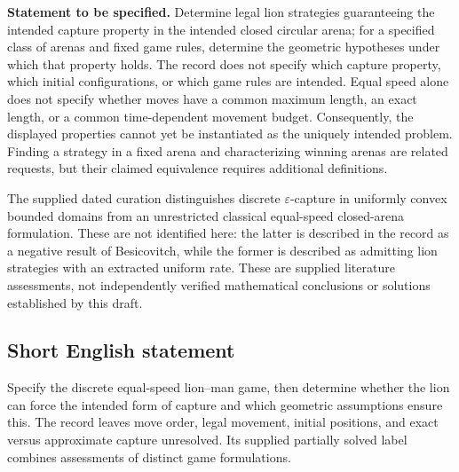 \documentclass[11pt]{article}
\begin{document}
\textbf{Statement to be specified.} Determine legal lion strategies guaranteeing the intended capture property in the intended closed circular arena; for a specified class of arenas and fixed game rules, determine the geometric hypotheses under which that property holds. The record does not specify which capture property, which initial configurations, or which game rules are intended. Equal speed alone does not specify whether moves have a common maximum length, an exact length, or a common time-dependent movement budget. Consequently, the displayed properties cannot yet be instantiated as the uniquely intended problem. Finding a strategy in a fixed arena and characterizing winning arenas are related requests, but their claimed equivalence requires additional definitions.

The supplied dated curation distinguishes discrete \(\varepsilon\)-capture in uniformly convex bounded domains from an unrestricted classical equal-speed closed-arena formulation. These are not identified here: the latter is described in the record as a negative result of Besicovitch, while the former is described as admitting lion strategies with an extracted uniform rate. These are supplied literature assessments, not independently verified mathematical conclusions or solutions established by this draft.
\subsection{Short English statement}
Specify the discrete equal-speed lion--man game, then determine whether the lion can force the intended form of capture and which geometric assumptions ensure this. The record leaves move order, legal movement, initial positions, and exact versus approximate capture unresolved. Its supplied partially solved label combines assessments of distinct game formulations.
\end{document}
